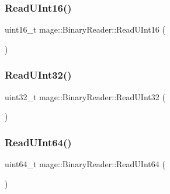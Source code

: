 \hypertarget{classmage_1_1_binary_reader_ad93616adef47e0256f117b8a6f8ba8bb}{}\label{classmage_1_1_binary_reader_ad93616adef47e0256f117b8a6f8ba8bb} 
\subsubsection{\texorpdfstring{Read\+U\+Int16()}{ReadUInt16()}}
{\footnotesize\ttfamily uint16\+\_\+t mage\+::\+Binary\+Reader\+::\+Read\+U\+Int16 (\begin{DoxyParamCaption}{ }\end{DoxyParamCaption})\hspace{0.3cm}{\ttfamily [protected]}}

\hypertarget{classmage_1_1_binary_reader_a4decb312a91e30406b82178268053f53}{}\label{classmage_1_1_binary_reader_a4decb312a91e30406b82178268053f53} 
\subsubsection{\texorpdfstring{Read\+U\+Int32()}{ReadUInt32()}}
{\footnotesize\ttfamily uint32\+\_\+t mage\+::\+Binary\+Reader\+::\+Read\+U\+Int32 (\begin{DoxyParamCaption}{ }\end{DoxyParamCaption})\hspace{0.3cm}{\ttfamily [protected]}}

\hypertarget{classmage_1_1_binary_reader_a480f2bd7320beed37a71b8122c8550bd}{}\label{classmage_1_1_binary_reader_a480f2bd7320beed37a71b8122c8550bd} 
\subsubsection{\texorpdfstring{Read\+U\+Int64()}{ReadUInt64()}}
{\footnotesize\ttfamily uint64\+\_\+t mage\+::\+Binary\+Reader\+::\+Read\+U\+Int64 (\begin{DoxyParamCaption}{ }\end{DoxyParamCaption})\hspace{0.3cm}{\ttfamily [protected]}}

